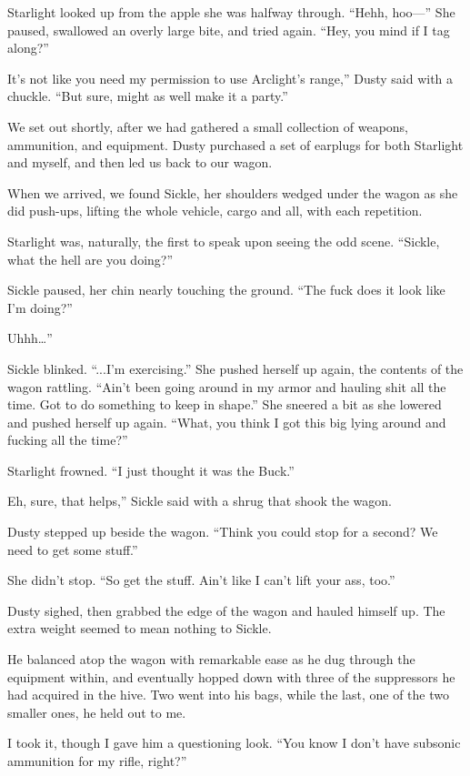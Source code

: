 Starlight looked up from the apple she was halfway through. “Hehh, hoo—” She paused, swallowed an overly large bite, and tried again. “Hey, you mind if I tag along?”

\leavevmode{}It’s not like you need my permission to use Arclight’s range,” Dusty said with a chuckle. “But sure, might as well make it a party.”

We set out shortly, after we had gathered a small collection of weapons, ammunition, and equipment. Dusty purchased a set of earplugs for both Starlight and myself, and then led us back to our wagon.

When we arrived, we found Sickle, her shoulders wedged under the wagon as she did push-ups, lifting the whole vehicle, cargo and all, with each repetition.

Starlight was, naturally, the first to speak upon seeing the odd scene. “Sickle, what the hell are you doing?”

Sickle paused, her chin nearly touching the ground. “The fuck does it look like I’m doing?”

\leavevmode{}Uhhh…”

Sickle blinked. “...I’m exercising.” She pushed herself up again, the contents of the wagon rattling. “Ain’t been going around in my armor and hauling shit all the time. Got to do something to keep in shape.” She sneered a bit as she lowered and pushed herself up again. “What, you think I got this big lying around and fucking all the time?”

Starlight frowned. “I just thought it was the Buck.”

\leavevmode{}Eh, sure, that helps,” Sickle said with a shrug that shook the wagon.

Dusty stepped up beside the wagon. “Think you could stop for a second? We need to get some stuff.”

She didn’t stop. “So get the stuff. Ain’t like I can’t lift your ass, too.”

Dusty sighed, then grabbed the edge of the wagon and hauled himself up. The extra weight seemed to mean nothing to Sickle.

He balanced atop the wagon with remarkable ease as he dug through the equipment within, and eventually hopped down with three of the suppressors he had acquired in the hive. Two went into his bags, while the last, one of the two smaller ones, he held out to me.

I took it, though I gave him a questioning look. “You know I don’t have subsonic ammunition for my rifle, right?”

